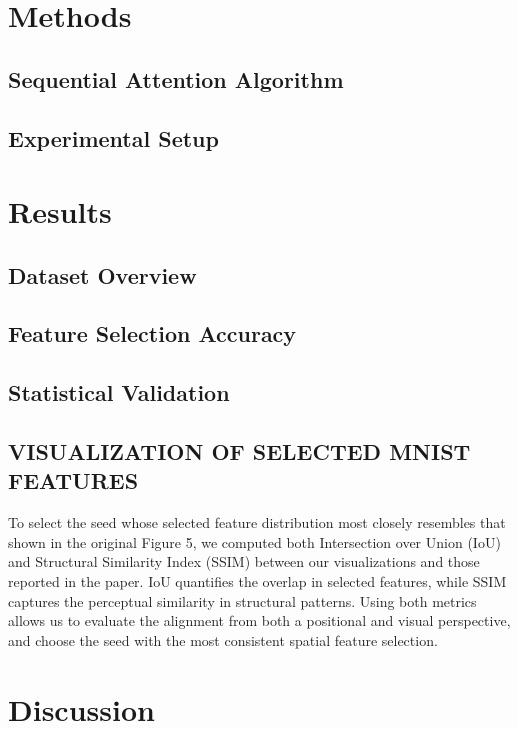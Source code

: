 \documentclass[a4paper,twocolumn]{article} %
\begin{document}
\section{Methods}
\subsection{Sequential Attention Algorithm}



\subsection{Experimental Setup}

\section{Results}
\subsection{Dataset Overview}


\subsection{Feature Selection Accuracy}


\subsection{Statistical Validation}
\subsection{VISUALIZATION OF SELECTED MNIST FEATURES}
To select the seed whose selected feature distribution most closely resembles that shown in the original Figure 5, we computed both Intersection over Union (IoU) and Structural Similarity Index (SSIM) between our visualizations and those reported in the paper. IoU quantifies the overlap in selected features, while SSIM captures the perceptual similarity in structural patterns. Using both metrics allows us to evaluate the alignment from both a positional and visual perspective, and choose the seed with the most consistent spatial feature selection.


\section{Discussion}
\end{document}
